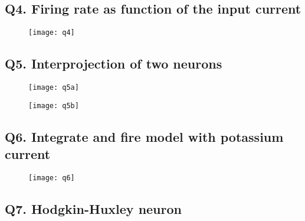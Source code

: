 \documentclass[DIV=calc, paper=a4, fontsize=11pt, twocolumn]{article}	 %
\begin{document}
	\subsection*{Q4. Firing rate as function of the input current}
		\begin{figure}[H]
			\texttt{[image: q4]}
		\end{figure}
	\subsection*{Q5. Interprojection of two neurons}
		\begin{figure}[H]
			\texttt{[image: q5a]}
		\end{figure}
		\begin{figure}[H]
			\texttt{[image: q5b]}
		\end{figure}
	\subsection*{Q6. Integrate and fire model with potassium current}
		\begin{figure}[H]
			\texttt{[image: q6]} %
		\end{figure}
	\subsection*{Q7. Hodgkin-Huxley neuron}
	
	
\end{document}
